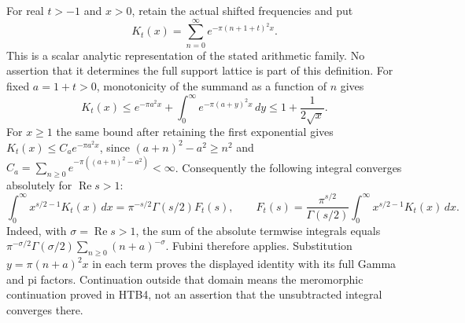 \documentclass[11pt]{article}
\begin{document}
For real $t>-1$ and $x>0$, retain the actual shifted frequencies and put
\begin{equation}\tag{ZTC2}
 K_t(x)=\sum_{n=0}^{\infty}
               e^{-\pi(n+1+t)^2x}.
\end{equation}
This is a scalar analytic representation of the stated arithmetic
family. No assertion that it determines the full support lattice is
part of this definition. For fixed $a=1+t>0$, monotonicity of the
summand as a function of $n$ gives
\begin{equation}\tag{ZTC3}
 K_t(x)\le e^{-\pi a^2x}
              +\int_0^\infty e^{-\pi(a+y)^2x}\,dy
 \le 1+\frac1{2\sqrt x}.
\end{equation}
For $x\ge1$ the same bound after retaining the first exponential
gives $K_t(x)\le C_a e^{-\pi a^2x}$, since
$(a+n)^2-a^2\ge n^2$ and
$C_a=\sum_{n\ge0}e^{-\pi((a+n)^2-a^2)}<\infty$.
Consequently the following integral converges absolutely for
$\operatorname{Re}s>1$:
\begin{equation}\tag{ZTC4}
 \int_0^\infty x^{s/2-1}K_t(x)\,dx
   =\pi^{-s/2}\Gamma(s/2)F_t(s),\qquad
 F_t(s)=\frac{\pi^{s/2}}{\Gamma(s/2)}
                \int_0^\infty x^{s/2-1}K_t(x)\,dx.
\end{equation}
Indeed, with $\sigma=\operatorname{Re}s>1$, the sum of the
absolute termwise integrals equals
$\pi^{-\sigma/2}\Gamma(\sigma/2)\sum_{n\ge0}(n+a)^{-\sigma}$.
Fubini therefore applies. Substitution $y=\pi(n+a)^2x$ in each
term proves the displayed identity with its full Gamma and pi factors.
Continuation outside that domain means the meromorphic continuation
proved in HTB4, not an assertion that the unsubtracted integral converges
there.
\end{document}
